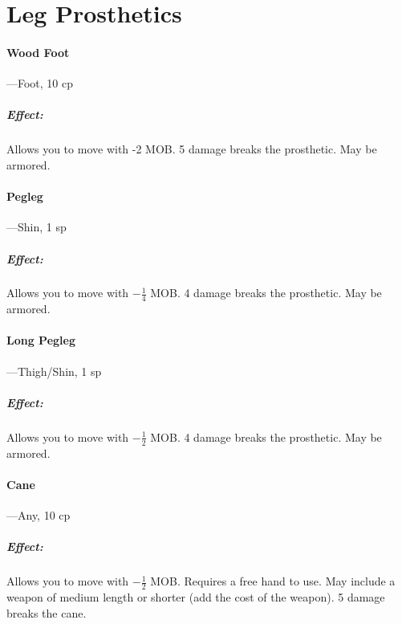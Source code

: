 \documentclass[oneside,11pt,english]{book}
\begin{document}
\section{Leg Prosthetics}
\paragraph{Wood Foot}---\quad Foot, 10 cp
\vspace{-15pt} \subparagraph{Effect:} Allows you to move with -2 MOB. 5 damage breaks the prosthetic. May be armored.
\paragraph{Pegleg}\label{par:Pegleg}
---\quad Shin, 1 sp
\vspace{-15pt} \subparagraph{Effect:} Allows you to move with $ -\frac{1}{4} $ MOB. 4 damage breaks the prosthetic. May be armored.
\paragraph{Long Pegleg}\label{par:Long Pegleg}
---\quad Thigh/Shin, 1 sp
\vspace{-15pt} \subparagraph{Effect:} Allows you to move with $ -\frac{1}{2} $ MOB. 4 damage breaks the prosthetic. May be armored.
\paragraph{Cane}---\quad Any, 10 cp
\vspace{-15pt} \subparagraph{Effect:} Allows you to move with $ -\frac{1}{2} $ MOB. Requires a free hand to use. May include a weapon of medium length or shorter (add the cost of the weapon). 5 damage breaks the cane.
\end{document}
